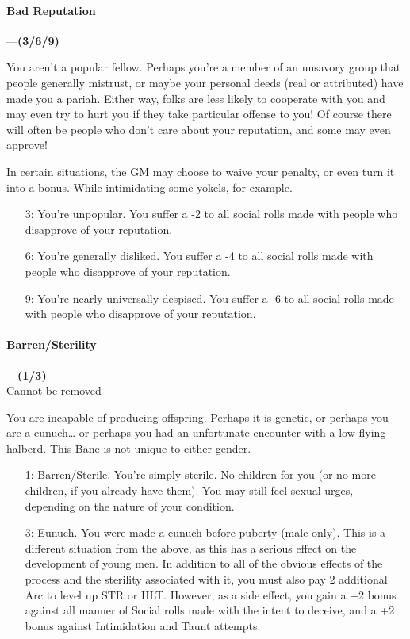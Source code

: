 \documentclass[oneside,11pt,english]{book}
\begin{document}
\paragraph{\label{bane:Bad Reputation}Bad Reputation}---\quad\textbf{(3/6/9) }\par
You aren't a popular fellow. Perhaps you're a member of an unsavory group that people generally 
mistrust, or maybe your personal deeds (real or attributed) have made you a
pariah. Either way, folks are less likely to cooperate with you and may even try
to hurt you if they take particular offense to you! Of course there will often
be people who don't care about your reputation, and some may even approve!  


In certain situations, the GM may choose to waive your penalty, or even turn it into a bonus. While 
intimidating some yokels, for example. 

\begin{itemize}
\item [3:] You're unpopular. You suffer a -2 to all social rolls made with people who disapprove of your 
  reputation. 
\item [6:] You're generally disliked. You suffer a -4 to all social rolls made with people who disapprove of your 
  reputation. 
\item [9:] You're nearly universally despised. You suffer a -6 to all social rolls made with people who disapprove 
  of your reputation. 
\end{itemize}
\paragraph{\label{bane:Barren/Sterility}Barren/Sterility}---\quad\textbf{(1/3)}\\
{Cannot be removed}\par
You are incapable of producing offspring. Perhaps it is genetic, or perhaps you are a eunuch… or perhaps 
you had an unfortunate encounter with a low-flying halberd. This Bane is not unique to either gender. 
\begin{itemize}
\item [1:] Barren/Sterile. You’re simply sterile. No children for you (or no more children, if you already have them). You may still feel sexual urges, depending on the nature of your condition.
\item [3:] Eunuch. You were made a eunuch before puberty (male only). This is a
  different situation from the above, as this has a serious effect on the
  development of young men. In addition to all of the obvious effects of the
  process and the sterility associated with it, you must also pay 2 additional
  Arc to level up STR or HLT. However, as a side effect, you gain a +2 bonus
  against all manner of Social rolls made with the intent to deceive, and a +2
  bonus against Intimidation and Taunt attempts. 
\end{itemize}
\end{document}
